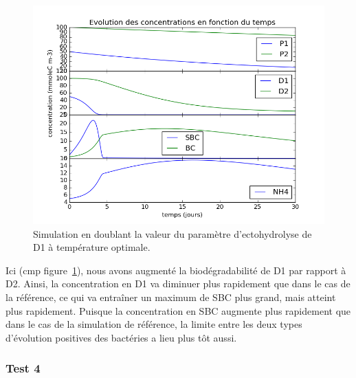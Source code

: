 \begin{figure}[h!]
  \includegraphics[width=\textwidth]{partie2/Test3.png}
  \caption{Simulation en doublant la valeur du param\`etre d'ectohydrolyse de D1 \`a temp\'erature optimale.
  }
  \label{fig:partie2test3}
\end{figure}

\par{
Ici (cmp figure~\ref{fig:partie2test3}),
nous avons augment\'e la biod\'egradabilit\'e de D1 par rapport \`a D2. Ainsi, la concentration en D1 va diminuer plus rapidement que dans le cas de la r\'ef\'erence, ce qui va entra\^iner un maximum de SBC plus grand, mais atteint plus rapidement. Puisque la concentration en SBC augmente plus rapidement que dans le cas de la simulation de r\'ef\'erence, la limite entre les deux types d'\'evolution positives des bact\'eries a lieu plus t\^ot aussi.
}

\FloatBarrier
\newpage
\subsubsection{Test 4}

